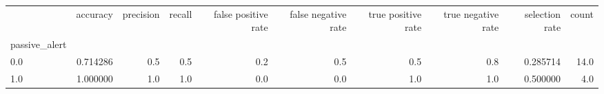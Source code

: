 \begin{tabular}{lrrrrrrrrr}
\toprule
{} &  accuracy &  precision &  recall &  false positive rate &  false negative rate &  true positive rate &  true negative rate &  selection rate &  count \\
passive\_alert &           &            &         &                      &                      &                     &                     &                 &        \\
\midrule
0.0           &  0.714286 &        0.5 &     0.5 &                  0.2 &                  0.5 &                 0.5 &                 0.8 &        0.285714 &   14.0 \\
1.0           &  1.000000 &        1.0 &     1.0 &                  0.0 &                  0.0 &                 1.0 &                 1.0 &        0.500000 &    4.0 \\
\bottomrule
\end{tabular}
